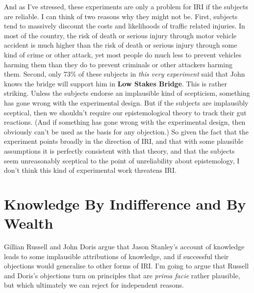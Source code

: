 \documentclass[oneside]{book}
\begin{document}
And as I've stressed, these experiments are only a problem for IRI if the subjects are reliable. I can think of two reasons why they might not be. First, subjects tend to massively discount the costs and likelihoods of traffic related injuries. In most of the country, the risk of death or serious injury through motor vehicle accident is much higher than the risk of death or serious injury through some kind of crime or other attack, yet most people do much less to prevent vehicles harming them than they do to prevent criminals or other attackers harming them. Second, only 73\% of these subjects in \textit{this very experiment} said that John knows the bridge will support him in \textbf{Low Stakes Bridge}. This is rather striking. Unless the subjects endorse an implausible kind of scepticism, something has gone wrong with the experimental design. But if the subjects are implausibly sceptical, then we shouldn't require our epistemological theory to track their gut reactions. (And if something has gone wrong with the experimental design, then obviously can't be used as the basis for any objection.) So given the fact that the experiment points broadly in the direction of IRI, and that with some plausible assumptions it is perfectly consistent with that theory, and that the subjects seem unreasonably sceptical to the point of unreliability about epistemology, I don't think this kind of experimental work threatens IRI.

\section{Knowledge By Indifference and By Wealth}

Gillian Russell and John Doris \citeyearpar{RussellDoris2008} argue that Jason Stanley's account of knowledge leads to some implausible attributions of knowledge, and if successful their objections would generalise to other forms of IRI. I'm going to argue that Russell and Doris's objections turn on principles that are \textit{prima facie} rather plausible, but which ultimately we can reject for independent reasons.
\end{document}
